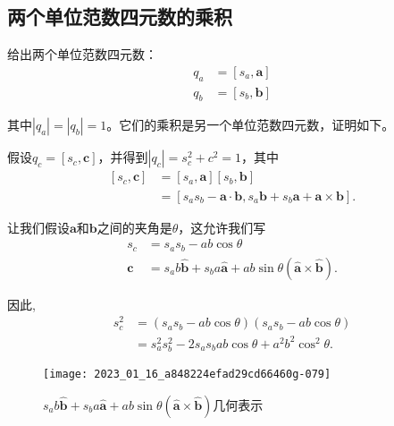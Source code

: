 \subsection{两个单位范数四元数的乘积}
给出两个单位范数四元数：
$$
\begin{aligned}
q_{a} & =\left[s_{a}, \mathbf{a}\right] \\
q_{b} & =\left[s_{b}, \mathbf{b}\right]
\end{aligned}
$$

其中$\left|q_{a}\right|=\left|q_{b}\right|=1$。它们的乘积是另一个单位范数四元数，证明如下。

假设$q_{c}=\left[s_{c}, \mathbf{c}\right]$，并得到$\left|q_{c}\right|=s_{c}^{2}+c^{2}=1$，其中
$$
\begin{aligned}
{\left[s_{c}, \mathbf{c}\right] } & =\left[s_{a}, \mathbf{a}\right]\left[s_{b}, \mathbf{b}\right] \\
& =\left[s_{a} s_{b}-\mathbf{a} \cdot \mathbf{b}, s_{a} \mathbf{b}+s_{b} \mathbf{a}+\mathbf{a} \times \mathbf{b}\right] .
\end{aligned}
$$

让我们假设$\mathbf{a}$和$\mathbf{b}$之间的夹角是$\theta$，这允许我们写
$$
\begin{aligned}
s_{c} & =s_{a} s_{b}-a b \cos \theta \\
\mathbf{c} & =s_{a} b \hat{\mathbf{b}}+s_{b} a \hat{\mathbf{a}}+a b \sin \theta(\hat{\mathbf{a}} \times \hat{\mathbf{b}}) .
\end{aligned}
$$

因此,
$$
\begin{aligned}
s_{c}^{2} & =\left(s_{a} s_{b}-a b \cos \theta\right)\left(s_{a} s_{b}-a b \cos \theta\right) \\
& =s_{a}^{2} s_{b}^{2}-2 s_{a} s_{b} a b \cos \theta+a^{2} b^{2} \cos ^{2} \theta .
\end{aligned}
$$

\begin{figure}[h!]
    \centering
    \texttt{[image: 2023\_01\_16\_a848224efad29cd66460g-079]}
    \caption[short]{$s_{a} b \hat{\mathbf{b}}+s_{b} a \hat{\mathbf{a}}+a b \sin \theta(\hat{\mathbf{a}} \times \hat{\mathbf{b}})$几何表示}
\end{figure}

